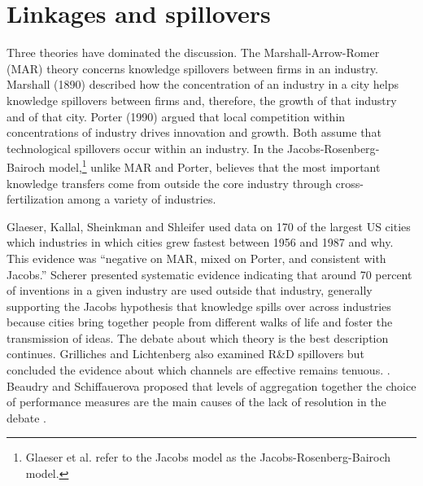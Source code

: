 \section{Linkages and spillovers}
Three theories have dominated the discussion. The Marshall-Arrow-Romer (MAR) theory concerns knowledge spillovers between firms in an industry.  Marshall (1890) described how the concentration of an industry in a city helps knowledge
spillovers between firms and, therefore, the growth of that industry and of that city. Porter (1990) argued that local competition within concentrations of industry drives innovation and growth. Both assume that technological spillovers occur within an industry. In the Jacobs-Rosenberg\cite{rosenbergTechnologicalChangeMachine1963}-Bairoch \cite{bairochCitiesEconomicDevelopment1988} model,\footnote{Glaeser et al.\cite{glaeserGrowthCities1991} refer to the Jacobs model as the Jacobs-Rosenberg\cite{rosenbergTechnologicalChangeMachine1963}-Bairoch \cite{bairochCitiesEconomicDevelopment1988} model. } unlike MAR and Porter, believes that the most important knowledge transfers come from outside the core industry through cross-fertilization among a variety  of  industries. 


Glaeser, Kallal, Sheinkman and Shleifer \cite{glaeserGrowthCities1991} used data on 170 of the largest US cities which industries in which cities grew fastest between 1956 and 1987 and why. %
This evidence was ``negative on MAR, mixed on Porter, and consistent with Jacobs.'' Scherer \cite{schererInterindustryTechnologyFlows1982} presented systematic evidence indicating that around 70 percent of inventions in a given industry are used outside that industry, generally supporting the Jacobs hypothesis that knowledge spills over across industries because cities bring together people from different walks of life and foster the transmission of ideas. The debate about which theory is the best description  continues. Grilliches and Lichtenberg also examined R\&D spillovers but concluded the evidence about which channels are effective remains tenuous. \cite{grilichesInterindustryTechnologyFlows1984}. Beaudry and Schiffauerova proposed that levels of  aggregation together the choice of performance measures are the main causes of the lack of resolution in the debate  \cite{beaudryWhoRightMarshall2009}.


